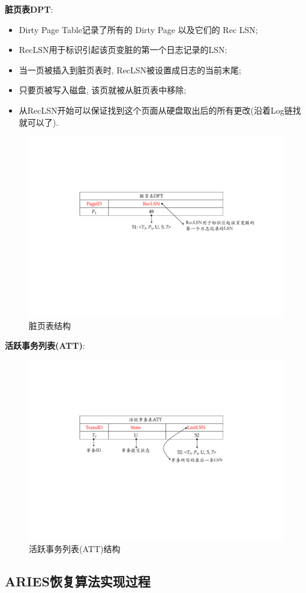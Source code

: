 \textbf{脏页表DPT}:
\begin{itemize}
    \item Dirty Page Table记录了所有的 Dirty Page 以及它们的 Rec LSN;
    \item RecLSN用于标识引起该页变脏的第一个日志记录的LSN;
    \item 当一页被插入到脏页表时, RecLSN被设置成日志的当前末尾;
    \item 只要页被写入磁盘, 该页就被从脏页表中移除;
    \item 从RecLSN开始可以保证找到这个页面从硬盘取出后的所有更改(沿着Log链找就可以了).
\end{itemize}

\begin{figure}[H]
    \centering
    \includegraphics[width=.8\textwidth]{figure/脏页表.pdf}
    \caption{脏页表结构}
\end{figure}

\textbf{活跃事务列表(ATT)}:
\begin{figure}[H]
    \centering
    \includegraphics[width=.65\textwidth]{figure/活跃事务表.pdf}
    \caption{活跃事务列表(ATT)结构}
\end{figure}

\subsection{ARIES恢复算法实现过程}

